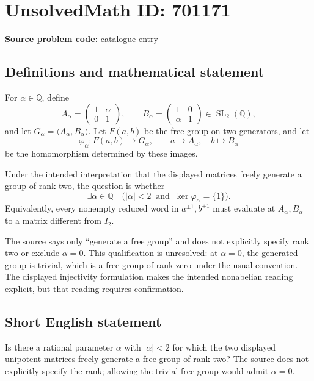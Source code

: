 \documentclass[11pt]{article}
\newcommand{\Q}{\mathbb{Q}}
\begin{document}
\section*{UnsolvedMath ID: 701171}
\textbf{Source problem code:} catalogue entry
\subsection{Definitions and mathematical statement}
For \(\alpha\in\Q\), define
\[
A_\alpha=\begin{pmatrix}1&\alpha\\0&1\end{pmatrix},\qquad
B_\alpha=\begin{pmatrix}1&0\\\alpha&1\end{pmatrix}
\in\operatorname{SL}_2(\Q),
\]
and let \(G_\alpha=\langle A_\alpha,B_\alpha\rangle\). Let \(F(a,b)\) be the free group on two generators, and let
\[
\varphi_\alpha:F(a,b)\longrightarrow G_\alpha,
\qquad a\longmapsto A_\alpha,\quad b\longmapsto B_\alpha
\]
be the homomorphism determined by these images.

Under the intended interpretation that the displayed matrices freely generate a group of rank two, the question is whether
\[
\exists\alpha\in\Q\quad\bigl(|\alpha|<2\ \text{ and }\ \ker\varphi_\alpha=\{1\}\bigr).
\]
Equivalently, every nonempty reduced word in \(a^{\pm1},b^{\pm1}\) must evaluate at \(A_\alpha,B_\alpha\) to a matrix different from \(I_2\).

The source says only ``generate a free group'' and does not explicitly specify rank two or exclude \(\alpha=0\). This qualification is unresolved: at \(\alpha=0\), the generated group is trivial, which is a free group of rank zero under the usual convention. The displayed injectivity formulation makes the intended nonabelian reading explicit, but that reading requires confirmation.
\subsection{Short English statement}
Is there a rational parameter \(\alpha\) with \(|\alpha|<2\) for which the two displayed unipotent matrices freely generate a free group of rank two? The source does not explicitly specify the rank; allowing the trivial free group would admit \(\alpha=0\).
\end{document}
